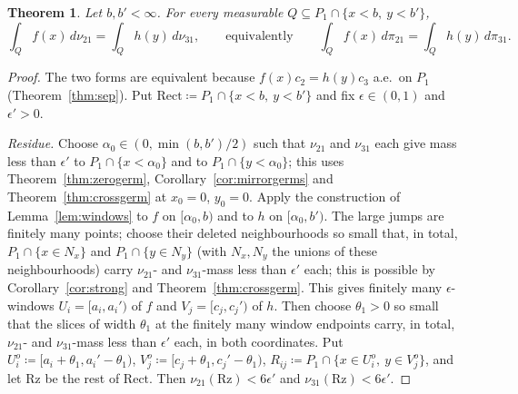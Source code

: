 \documentclass[11pt]{article}
\newtheorem{theorem}{Theorem}
\theoremstyle{definition}\newtheorem{definition}[theorem]{Definition}
\theoremstyle{remark}\newtheorem{remark}[theorem]{Remark}
\begin{document}
\begin{theorem}\label{thm:puresep}
Let $b,b'<\infty$. For every measurable $Q\subseteq P_1\cap\{x<b,\ y<b'\}$,
\[
 \int_Qf(x)\,d\nu_{21}=\int_Qh(y)\,d\nu_{31},\qquad\text{equivalently}\qquad
 \int_Qf(x)\,d\pi_{21}=\int_Qh(y)\,d\pi_{31}.
\]
\end{theorem}
\begin{proof}
The two forms are equivalent because $f(x)c_2=h(y)c_3$ a.e.\ on $P_1$
(Theorem~\ref{thm:sep}). Put $\mathrm{Rect}\coloneqq P_1\cap\{x<b,\ y<b'\}$
and fix $\epsilon\in(0,1)$ and $\epsilon'>0$.

\emph{Residue.} Choose $\alpha_0\in(0,\min(b,b')/2)$ such that $\nu_{21}$ and
$\nu_{31}$ each give mass less than $\epsilon'$ to $P_1\cap\{x<\alpha_0\}$
and to $P_1\cap\{y<\alpha_0\}$; this uses Theorem~\ref{thm:zerogerm},
Corollary~\ref{cor:mirrorgerms} and Theorem~\ref{thm:crossgerm} at $x_0=0$,
$y_0=0$. Apply the construction of Lemma~\ref{lem:windows} to $f$ on
$[\alpha_0,b)$ and to $h$ on $[\alpha_0,b')$. The large jumps are finitely
many points; choose their deleted neighbourhoods so small that, in total,
$P_1\cap\{x\in N_x\}$ and $P_1\cap\{y\in N_y\}$ (with $N_x,N_y$ the unions of
these neighbourhoods) carry $\nu_{21}$- and $\nu_{31}$-mass less than
$\epsilon'$ each; this is possible by Corollary~\ref{cor:strong} and
Theorem~\ref{thm:crossgerm}. This gives finitely many $\epsilon$-windows
$U_i=[a_i,a_i')$ of $f$ and $V_j=[c_j,c_j')$ of $h$. Then choose $\theta_1>0$
so small that the slices of width $\theta_1$ at the finitely many window
endpoints carry, in total, $\nu_{21}$- and $\nu_{31}$-mass less than
$\epsilon'$ each, in both coordinates. Put $U_i^o\coloneqq[a_i+\theta_1,a_i'-\theta_1)$, $V_j^o
\coloneqq[c_j+\theta_1,c_j'-\theta_1)$, $R_{ij}\coloneqq P_1\cap\{x\in
U_i^o,\ y\in V_j^o\}$, and let $\mathrm{Rz}$ be the rest of
$\mathrm{Rect}$. Then $\nu_{21}(\mathrm{Rz})<6\epsilon'$ and
$\nu_{31}(\mathrm{Rz})<6\epsilon'$.


\end{proof}
\end{document}
